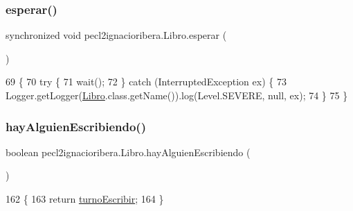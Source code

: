 \subsubsection{\texorpdfstring{esperar()}{esperar()}}
{\footnotesize\ttfamily synchronized void pecl2ignacioribera.\+Libro.\+esperar (\begin{DoxyParamCaption}{ }\end{DoxyParamCaption})\hspace{0.3cm}{\ttfamily [inline]}}


\begin{DoxyCode}
69     \{
70         \textcolor{keywordflow}{try} \{
71             wait();
72         \} \textcolor{keywordflow}{catch} (InterruptedException ex) \{
73             Logger.getLogger(\mbox{\hyperlink{classpecl2ignacioribera_1_1_libro_a959d8e97c56f6a3f9f779f26674f12a2}{Libro}}.class.getName()).log(Level.SEVERE, null, ex);
74         \}
75     \}
\end{DoxyCode}
\mbox{\label{classpecl2ignacioribera_1_1_libro_ab8a6fd43e4d95068bbb7cfbcf5ff04a5}} 
\subsubsection{\texorpdfstring{hay\+Alguien\+Escribiendo()}{hayAlguienEscribiendo()}}
{\footnotesize\ttfamily boolean pecl2ignacioribera.\+Libro.\+hay\+Alguien\+Escribiendo (\begin{DoxyParamCaption}{ }\end{DoxyParamCaption})\hspace{0.3cm}{\ttfamily [inline]}}


\begin{DoxyCode}
162     \{
163         \textcolor{keywordflow}{return} \mbox{\hyperlink{classpecl2ignacioribera_1_1_libro_a34d076d438d7b6309b4b499a94d52277}{turnoEscribir}};
164     \}
\end{DoxyCode}
\mbox{\label{classpecl2ignacioribera_1_1_libro_a3ec78c4737fd60d84388e87f7f1d606f}} 

